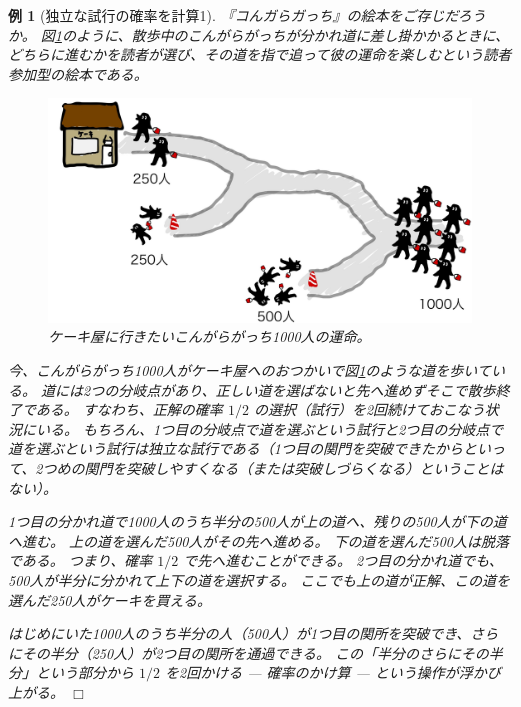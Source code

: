 \documentclass[12pt]{ltjsarticle}\usepackage{ifthen}\newcounter{enlarge}\setcounter{enlarge}{1}
\def\qed{\hfill $\Box$}
\newtheorem{eg}{例}
\begin{document}
\begin{eg}[独立な試行の確率を計算1]
  『コんガらガっち』の絵本をご存じだろうか。
  図\ref{f:2.2.2}のように、散歩中のこんがらがっちが分かれ道に差し掛かかるときに、どちらに進むかを読者が選び、その道を指で追って彼の運命を楽しむという読者参加型の絵本である。

  \begin{figure}[] 
    \centering 
    \includegraphics[width=12truecm]{./figure/f2-2-2.jpg}
    \captionsetup{width=.9\linewidth}
    \caption{%
      ケーキ屋に行きたいこんがらがっち1000人の運命。
    }
    \label{f:2.2.2}
  \end{figure}

  今、こんがらがっち1000人がケーキ屋へのおつかいで図\ref{f:2.2.2}のような道を歩いている。
  道には2つの分岐点があり、正しい道を選ばないと先へ進めずそこで散歩終了である。
  すなわち、正解の確率 $1/2$ の選択（試行）を2回続けておこなう状況にいる。
  もちろん、1つ目の分岐点で道を選ぶという試行と2つ目の分岐点で道を選ぶという試行は独立な試行である（1つ目の関門を突破できたからといって、2つめの関門を突破しやすくなる（または突破しづらくなる）ということはない）。

  1つ目の分かれ道で1000人のうち半分の500人が上の道へ、残りの500人が下の道へ進む。
  上の道を選んだ500人がその先へ進める。
  下の道を選んだ500人は脱落である。
  つまり、確率 $1/2$ で先へ進むことができる。
  2つ目の分かれ道でも、500人が半分に分かれて上下の道を選択する。
  ここでも上の道が正解、この道を選んだ250人がケーキを買える。

  はじめにいた1000人のうち半分の人（500人）が1つ目の関所を突破でき、さらにその半分（250人）が2つ目の関所を通過できる。
  この「半分のさらにその半分」という部分から $1/2$ を2回かける --- 確率のかけ算 --- という操作が浮かび上がる。
\qed\end{eg}
\end{document}
